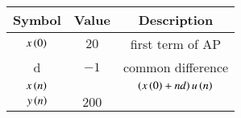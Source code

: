 \begin{tabular}{|c|c|c|}
   \hline
   \textbf{Symbol} & \textbf{Value}& \textbf{Description} \\
   \hline
        $ x\left(0\right)$ & $20$ & first term of AP\\
        \hline
        d & ${-1}$ & common difference\\
        \hline
        $x\left(n\right)$ &  & $\left(x\left(0\right)+nd\right)u\left(n\right)$\\
        \hline
        $y\left(n\right)$ & $200$ & \\
        \hline
\end{tabular}
